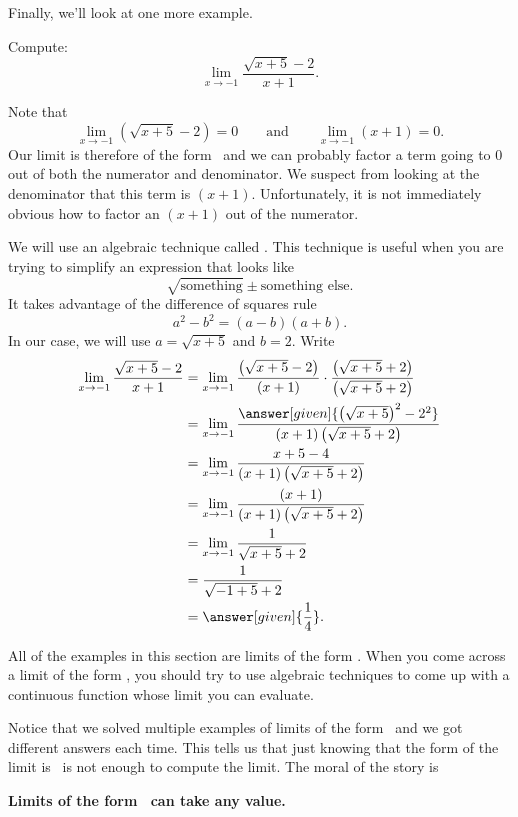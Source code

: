 \documentclass{ximera}
\begin{document}
Finally, we'll look at one more example.

\begin{example}
  Compute:
  \[
  \lim_{x\to-1} \frac{\sqrt{x+5}-2}{x+1}.
  \]

\begin{explanation} 
  Note that 
  \[
  \lim_{x\to-1} \left(\sqrt{x+5}-2\right)=0\qquad\text{and}\qquad\lim_{x\to -1} \left(x+1\right) =0.
  \]
  Our limit is therefore of the form \zeroOverZero\ and we
  can probably factor a term going to $0$ out of both the numerator
  and denominator.  We suspect from looking at the denominator that
  this term is $(x+1)$.  Unfortunately, it is not immediately obvious
  how to factor an $(x+1)$ out of the numerator.
 
  We will use an algebraic technique called .  This technique is useful when you are trying to
  simplify an expression that looks like
  \[
  \sqrt{\text{something}} \pm \text{something else}.
  \]
  It takes advantage of the difference of squares rule 
  \[
  a^2-b^2=(a-b)(a+b).
  \]
  In our case, we will use $a=\sqrt{x+5}$ and $b=2$.  Write
\begin{align*}
\lim_{x\to-1} \frac{\sqrt{x+5}-2}{x+1}&=
\lim_{x\to-1} \frac{\left(\sqrt{x+5}-2\right)}{(x+1)} \cdot \frac{\left(\sqrt{x+5}+2\right)}{\left(\sqrt{x+5}+2\right)} \\
&=\lim_{x\to-1} \frac{\answer[given]{\left(\sqrt{x+5}\right)^2-2^2}}{(x+1)\left(\sqrt{x+5}+2\right)} \\
&=\lim_{x\to-1} \frac{x+5-4}{(x+1)\left(\sqrt{x+5}+2\right)} \\
&=\lim_{x\to-1} \frac{(x+1)}{(x+1)\left(\sqrt{x+5}+2\right)} \\
&=\lim_{x\to-1} \frac{1}{\sqrt{x+5}+2}\\
&= \frac{1}{\sqrt{-1+5}+2}\\
&=\answer[given]{\frac{1}{4}}.
\end{align*}
\end{explanation}
\end{example}

All of the examples in this section are limits of the form \zeroOverZero.
When you come across a limit of the form \zeroOverZero, you should try
to use algebraic techniques to come up with a continuous
function whose limit you can evaluate.

Notice that we solved multiple examples of limits of the form
\zeroOverZero\ and we got different answers each time.  This tells us
that just knowing that the form of the limit is \zeroOverZero\ is not enough
to compute the limit. The moral of the story is
\begin{center}
  \textbf{Limits of the form \zeroOverZero\ can take any value.}
\end{center}
\end{document}
